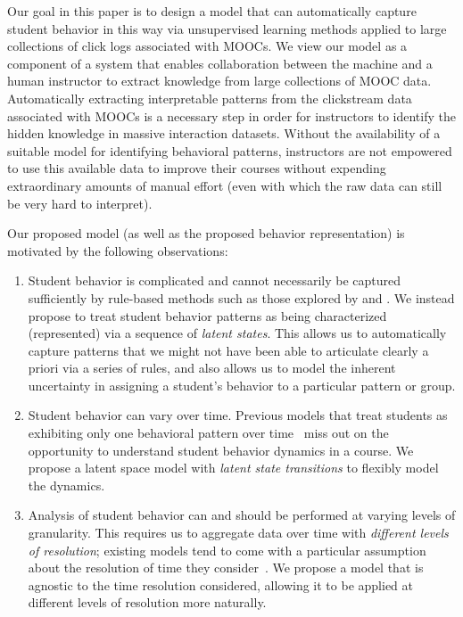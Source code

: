 Our goal in this paper is to design a model that can automatically capture
student behavior in this way via unsupervised learning methods applied to
large collections of click logs associated with MOOCs. We view our model
as a component of a system that enables collaboration between the machine
and a human instructor to extract knowledge from large collections of
MOOC data. Automatically extracting interpretable patterns from the
clickstream data associated with MOOCs is a necessary step in order for
instructors to identify the hidden knowledge in massive interaction
datasets. Without the availability of a suitable model for identifying
behavioral patterns, instructors are not empowered to use this available
data to improve their courses without expending extraordinary amounts of
manual effort (even with which the raw data can still be very hard to
interpret).

Our proposed model (as well as the proposed behavior representation) is
motivated by the following observations:
\begin{enumerate}
  \item Student behavior is complicated and cannot necessarily be captured
      sufficiently by rule-based methods such as those explored by
      \citet{Kizilcec:2013:LAK} and \citet{Davis:2016:EDM}. We instead
      propose to treat student behavior patterns as being characterized
      (represented) via a sequence of \emph{latent states}. This allows us
      to automatically capture patterns that we might not have been able to
      articulate clearly a priori via a series of rules, and also allows us
      to model the inherent uncertainty in assigning a student's behavior
      to a particular pattern or group.
  \item Student behavior can vary over time. Previous models that treat students
      as exhibiting only one behavioral pattern over
      time~\cite{Faucon:2016:EDM} miss out on the opportunity to understand
      student behavior dynamics in a course. We propose a latent space
      model with {\em latent state transitions} to flexibly model the
      dynamics.
  \item Analysis of student behavior can and should be performed at varying
      levels of granularity. This requires us to aggregate data over time
      with \emph{different levels of resolution}; existing models tend to come
      with a particular assumption about the resolution of time they
      consider~\cite{Faucon:2016:EDM, Kizilcec:2013:LAK, Shih:2010:EDM}. We
      propose a model that is agnostic to the time resolution considered,
      allowing it to be applied at different levels of resolution more
      naturally.
\end{enumerate}

